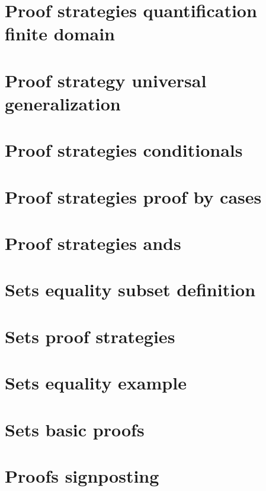 \section*{Proof strategies quantification finite domain}

\vfill
\section*{Proof strategy universal generalization}

\vfill
\section*{Proof strategies conditionals}

\vfill
\section*{Proof strategies proof by cases}

\vfill
\section*{Proof strategies ands}

\vfill
\section*{Sets equality subset definition}

\vfill
\section*{Sets proof strategies}

\vfill
\section*{Sets equality example}

\vfill
\section*{Sets basic proofs}

\vfill
\section*{Proofs signposting}

\vfill
